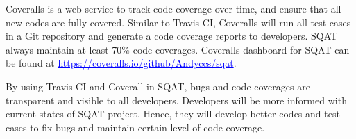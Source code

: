 Coveralls is a web service to track code coverage over time, and ensure that all new codes are fully covered. Similar to Travis CI, Coveralls will run all test cases in a Git repository and generate a code coverage reports to developers. SQAT always maintain at least 70\% code coverages. Coveralls dashboard for SQAT can be found at \textcolor{blue}{\underline{https://coveralls.io/github/Andyccs/sqat}}.

By using Travis CI and Coverall in SQAT, bugs and code coverages are transparent and visible to all developers. Developers will be more informed with current states of SQAT project. Hence, they will develop better codes and test cases to fix bugs and maintain certain level of code coverage.